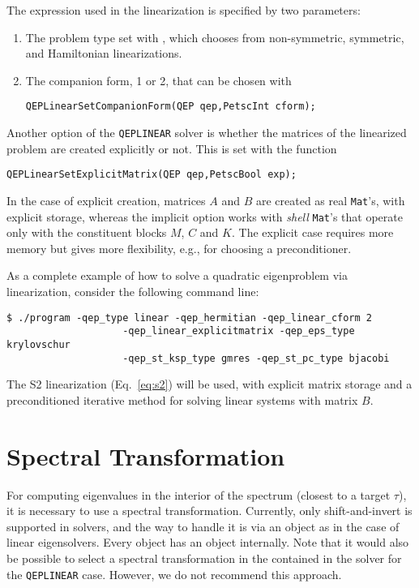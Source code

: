 The expression used in the linearization is specified by two parameters:
\begin{enumerate}
\item The problem type set with , which chooses from non-symmetric, symmetric, and Hamiltonian linearizations.
\item The companion form, 1 or 2, that can be chosen with
	\begin{Verbatim}[fontsize=\small]
   QEPLinearSetCompanionForm(QEP qep,PetscInt cform);
	\end{Verbatim}
\end{enumerate}

Another option of the \texttt{QEPLINEAR} solver is whether the matrices of the linearized problem are created explicitly or not. This is set with the function
	\begin{Verbatim}[fontsize=\small]
	QEPLinearSetExplicitMatrix(QEP qep,PetscBool exp);
	\end{Verbatim}
In the case of explicit creation, matrices $A$ and $B$ are created as real \texttt{Mat}'s, with explicit storage, whereas the implicit option works with \emph{shell} \texttt{Mat}'s that operate only with the constituent blocks $M$, $C$ and $K$. The explicit case requires more memory but gives more flexibility, e.g., for choosing a preconditioner.

As a complete example of how to solve a quadratic eigenproblem via linearization, consider the following command line:
\begin{Verbatim}[fontsize=\small]
	$ ./program -qep_type linear -qep_hermitian -qep_linear_cform 2
                    -qep_linear_explicitmatrix -qep_eps_type krylovschur
                    -qep_st_ksp_type gmres -qep_st_pc_type bjacobi
\end{Verbatim}
The S2 linearization (Eq.\ \ref{eq:s2}) will be used, with explicit matrix storage and a preconditioned iterative method for solving linear systems with matrix $B$.

\section{\label{sec:qst}Spectral Transformation}

For computing eigenvalues in the interior of the spectrum (closest to a target $\tau$), it is necessary to use a spectral transformation. Currently, only shift-and-invert is supported in  solvers, and the way to handle it is via an  object as in the case of linear eigensolvers. Every  object has an  object internally. Note that it would also be possible to select a spectral transformation in the  contained in the  solver for the \texttt{QEPLINEAR} case. However, we do not recommend this approach.

